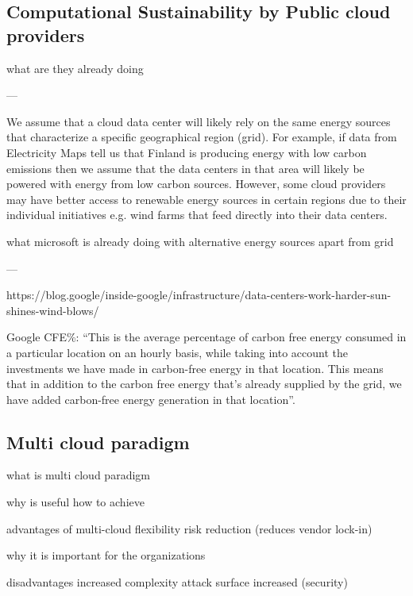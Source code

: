 
\subsection{Computational Sustainability by Public cloud providers}

what are they already doing

---

We assume that a cloud data center will likely rely on the same energy sources that characterize a specific geographical region (grid).
For example, if data from Electricity Maps tell us that Finland is producing energy with low carbon emissions then we assume that the data centers in that area will likely be powered with energy from low carbon sources.
However, some cloud providers may have better access to renewable energy sources in certain regions due to their individual initiatives e.g. wind farms that feed directly into their data centers.


what microsoft is already doing with alternative energy sources apart from grid


---

https://blog.google/inside-google/infrastructure/data-centers-work-harder-sun-shines-wind-blows/

Google CFE\%: “This is the average percentage of carbon free energy consumed in a particular location on an hourly basis, while taking into account the investments we have made in carbon-free energy in that location. This means that in addition to the carbon free energy that's already supplied by the grid, we have added carbon-free energy generation in that location”.

\subsection{Multi cloud paradigm}

what is multi cloud paradigm

why is useful
how to achieve

advantages of multi-cloud
flexibility
risk reduction (reduces vendor lock-in)

why it is important for the organizations


disadvantages
increased complexity
attack surface increased (security)




